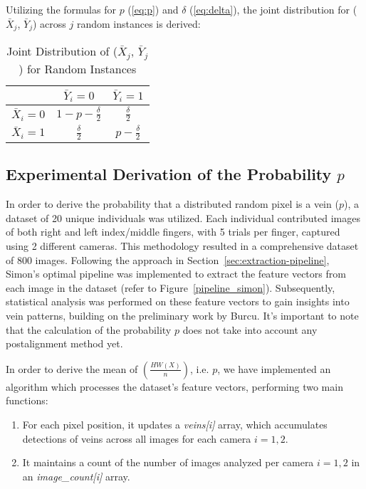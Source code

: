 Utilizing the formulas for \(p\) (\ref{eq:p}) and $\delta$ (\ref{eq:delta}), the joint distribution for (\(\bar{X}_j\), \(\bar{Y}_j\)) across \(j\) random instances is derived:

\begin{table}[H]
    \centering
    \renewcommand{\arraystretch}{1.5}
    \begin{tabular}{|c|c|c|}
        \hline
        & $\bar{Y}_i = 0$ & $\bar{Y}_i = 1$\\
        \hline
        $\bar{X}_i = 0$ & $1 - p - \frac{\delta}{2}$ & $\frac{\delta}{2}$\\
        \hline
        $\bar{X}_i = 1$ & $\frac{\delta}{2}$ & $p - \frac{\delta}{2}$\\
        \hline
    \end{tabular}
    \caption{Joint Distribution of ($\bar{X}_j$, $\bar{Y}_j$) for Random Instances}
    \label{tab:joint_distribution}
\end{table}

\subsection{Experimental Derivation of the Probability \(p\)}
\label{sec:p}
In order to derive the probability that a distributed random pixel is a vein (\(p\)), a dataset of 20 unique individuals was utilized. Each individual contributed images of both right and left index/middle fingers, with 5 trials per finger, captured using 2 different cameras. This methodology resulted in a comprehensive dataset of 800 images. Following the approach in Section~\ref{sec:extraction-pipeline}, Simon's optimal pipeline was implemented to extract the feature vectors from each image in the dataset (refer to Figure~\ref{pipeline_simon}). Subsequently, statistical analysis was performed on these feature vectors to gain insights into vein patterns, building on the preliminary work by Burcu. It's important to note that the calculation of the probability \(p\) does not take into account any postalignment method yet.

In order to derive the mean of \(\left( \frac{HW(X)}{n} \right)\), i.e. \(p\), we have implemented an algorithm which processes the dataset's feature vectors, performing two main functions:
\begin{enumerate}
    \item For each pixel position, it updates a \textit{veins[i]} array, which accumulates detections of veins across all images for each camera \(i={1,2}\).
    \item It maintains a count of the number of images analyzed per camera \(i={1,2}\) in an \textit{image\_count[i]} array.
\end{enumerate}

